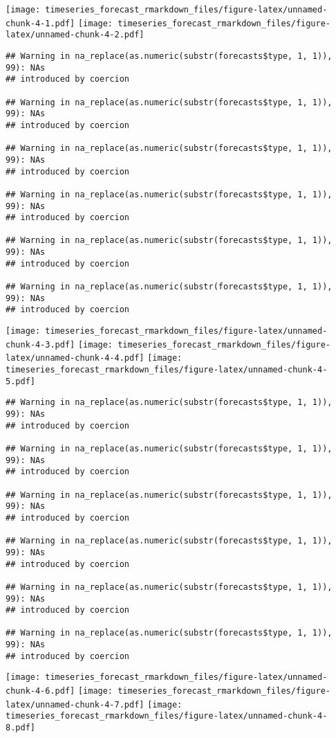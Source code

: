 \documentclass[
]{article}
\begin{document}
\texttt{[image: timeseries\_forecast\_rmarkdown\_files/figure-latex/unnamed-chunk-4-1.pdf]}
\texttt{[image: timeseries\_forecast\_rmarkdown\_files/figure-latex/unnamed-chunk-4-2.pdf]}

\begin{verbatim}
## Warning in na_replace(as.numeric(substr(forecasts$type, 1, 1)), 99): NAs
## introduced by coercion

## Warning in na_replace(as.numeric(substr(forecasts$type, 1, 1)), 99): NAs
## introduced by coercion

## Warning in na_replace(as.numeric(substr(forecasts$type, 1, 1)), 99): NAs
## introduced by coercion

## Warning in na_replace(as.numeric(substr(forecasts$type, 1, 1)), 99): NAs
## introduced by coercion

## Warning in na_replace(as.numeric(substr(forecasts$type, 1, 1)), 99): NAs
## introduced by coercion

## Warning in na_replace(as.numeric(substr(forecasts$type, 1, 1)), 99): NAs
## introduced by coercion
\end{verbatim}

\texttt{[image: timeseries\_forecast\_rmarkdown\_files/figure-latex/unnamed-chunk-4-3.pdf]}
\texttt{[image: timeseries\_forecast\_rmarkdown\_files/figure-latex/unnamed-chunk-4-4.pdf]}
\texttt{[image: timeseries\_forecast\_rmarkdown\_files/figure-latex/unnamed-chunk-4-5.pdf]}

\begin{verbatim}
## Warning in na_replace(as.numeric(substr(forecasts$type, 1, 1)), 99): NAs
## introduced by coercion

## Warning in na_replace(as.numeric(substr(forecasts$type, 1, 1)), 99): NAs
## introduced by coercion

## Warning in na_replace(as.numeric(substr(forecasts$type, 1, 1)), 99): NAs
## introduced by coercion

## Warning in na_replace(as.numeric(substr(forecasts$type, 1, 1)), 99): NAs
## introduced by coercion

## Warning in na_replace(as.numeric(substr(forecasts$type, 1, 1)), 99): NAs
## introduced by coercion

## Warning in na_replace(as.numeric(substr(forecasts$type, 1, 1)), 99): NAs
## introduced by coercion
\end{verbatim}

\texttt{[image: timeseries\_forecast\_rmarkdown\_files/figure-latex/unnamed-chunk-4-6.pdf]}
\texttt{[image: timeseries\_forecast\_rmarkdown\_files/figure-latex/unnamed-chunk-4-7.pdf]}
\texttt{[image: timeseries\_forecast\_rmarkdown\_files/figure-latex/unnamed-chunk-4-8.pdf]}
\end{document}
